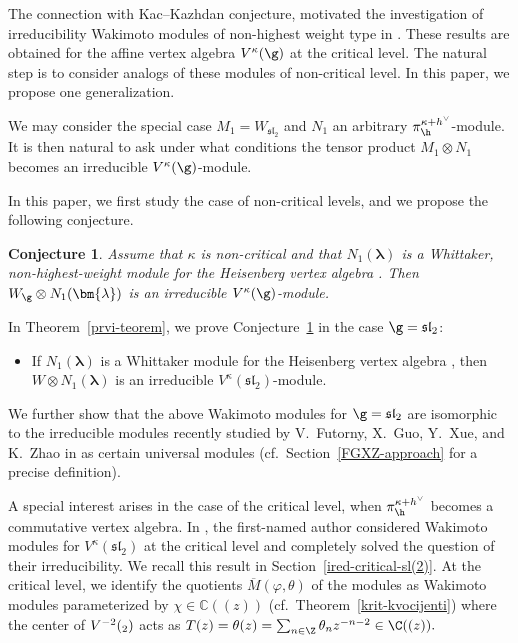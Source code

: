\documentclass[10pt,a4paper]{amsart}
\numberwithin{equation}{section}
\newtheorem{Conjecture}[Theorem]{Conjecture}
\theoremstyle{definition}
\newcommand{\1}{\textbf{1}}
\begin{document}
The connection with Kac--Kazhdan conjecture, motivated the investigation of irreducibility Wakimoto modules of non-highest weight type in \cite{A-07, A-14, AJM}. These results are obtained for the affine vertex algebra $V^{\kappa}(\g)$ at the critical level. The natural step is to consider analogs of these modules of non-critical level. In this paper, we propose one generalization.

We may consider the special case $M_1 = W_{\mathfrak{sl}_2}$ and $N_1$ an arbitrary $\pi_{\h}^{\kappa + h^{\vee}}$-module.
It is then natural to ask under what conditions the tensor product $M_1 \otimes N_1$ becomes an irreducible $V^{\kappa}(\g)$-module.

In this paper, we first study the case of non-critical levels, and we propose the following conjecture.

\begin{Conjecture} \label{slutnja}
Assume that $\kappa$ is non-critical and that
$N_1(\bm{\lambda})$ is a Whittaker, non-highest-weight module for the Heisenberg vertex algebra .
Then $W_{\g} \otimes N_1(\bm{\lambda})$ is an irreducible $V^{\kappa}(\g)$-module.
\end{Conjecture}

In Theorem~\ref{prvi-teorem}, we prove Conjecture~\ref{slutnja} in the case $\g = \mathfrak{sl}_2$:
\begin{itemize}\itemsep=0pt
 \item If $N_1(\bm{\lambda})$ is a Whittaker module for the Heisenberg vertex algebra ,
 then $W \otimes N_1(\bm{\lambda})$ is an irreducible $V^{\kappa}(\mathfrak{sl}_2)$-module.
\end{itemize}

We further show that the above Wakimoto modules for $\g = \mathfrak{sl}_2$ are isomorphic to the irreducible modules
 recently studied by V.~Futorny, X.~Guo, Y.~Xue, and K.~Zhao in \cite{FGXZ} as certain universal modules
(cf.~Section~\ref{FGXZ-approach} for a precise definition).

A special interest arises in the case of the critical level, when $\pi_{\h}^{\kappa + h^{\vee}}$ becomes a commutative vertex algebra.
In \cite{A-07,A-14}, the first-named author considered Wakimoto modules for $V^{\kappa}(\mathfrak{sl}_2)$ at the critical level
and completely solved the question of their irreducibility.
We recall this result in Section~\ref{ired-critical-sl(2)}.
At the critical level, we identify the quotients $\overline{M}(\varphi, \theta)$ of the modules 
as Wakimoto modules parameterized by $\chi \in \mathbb{C}((z))$ (cf.~Theorem~\ref{krit-kvocijenti})
where
the center of $V^{-2} (\sl_2)$ acts as $ T(z) = \theta(z) = \sum _{n \in {\Z}} \theta_n z^{-n-2} \in \C((z)).$
\end{document}
